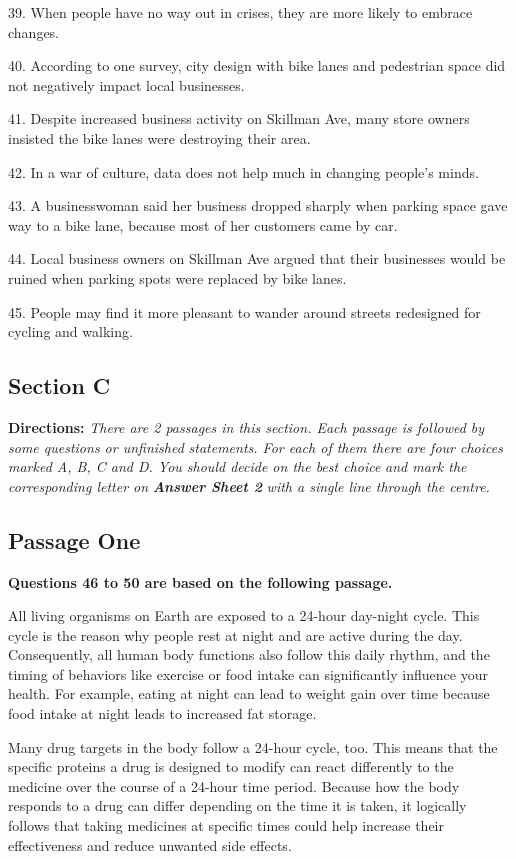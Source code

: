 \documentclass[UTF8,11pt]{ctexart}
\begin{document}
39. When people have no way out in crises, they are more likely to embrace changes.


40. According to one survey, city design with bike lanes and pedestrian space did not negatively impact local businesses.


41. Despite increased business activity on Skillman Ave, many store owners insisted the bike lanes were destroying their area.


42. In a war of culture, data does not help much in changing people’s minds.


43. A businesswoman said her business dropped sharply when parking space gave way to a bike lane, because most of her customers came by car.


44. Local business owners on Skillman Ave argued that their businesses would be ruined when parking spots were replaced by bike lanes.


45. People may find it more pleasant to wander around streets redesigned for cycling and walking.


\subsection*{\textbf{Section C}}


\textbf{Directions: }\textit{There are 2 passages in this section. Each passage is followed by some questions or unfinished} \textit{statements. For each of them there are four choices marked A, B, C and D. You should decide on the best choice} \textit{and mark the corresponding letter on }\textbf{\textit{Answer Sheet 2}}\textit{ with a single line through the centre.}


\subsection*{\textbf{Passage One}}


\textbf{Questions 46 to 50 are based on the following passage.}


All living organisms on Earth are exposed to a 24-hour day-night cycle. This cycle is the reason why people rest at night and are active during the day. Consequently, all human body functions also follow this daily rhythm, and the timing of behaviors like exercise or food intake can significantly influence your health. For example, eating at night can lead to weight gain over time because food intake at night leads to increased fat storage.


Many drug targets in the body follow a 24-hour cycle, too. This means that the specific proteins a drug is designed to modify can react differently to the medicine over the course of a 24-hour time period. Because how the body responds to a drug can differ depending on the time it is taken, it logically follows that taking medicines at specific times could help increase their effectiveness and reduce unwanted side effects.
\end{document}
